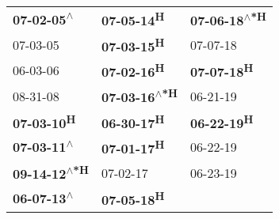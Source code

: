 \begin{supertabular}{lll}
   \textbf{07-02-05\textsuperscript{$\wedge$}} &           \textbf{07-05-14\textsuperscript{H}} &  \textbf{07-06-18\textsuperscript{$\wedge$*H}} \\
                    07-03-05\textsuperscript{} &           \textbf{07-03-15\textsuperscript{H}} &                     07-07-18\textsuperscript{} \\
                    06-03-06\textsuperscript{} &           \textbf{07-02-16\textsuperscript{H}} &           \textbf{07-07-18\textsuperscript{H}} \\
                    08-31-08\textsuperscript{} &  \textbf{07-03-16\textsuperscript{$\wedge$*H}} &                     06-21-19\textsuperscript{} \\
          \textbf{07-03-10\textsuperscript{H}} &           \textbf{06-30-17\textsuperscript{H}} &           \textbf{06-22-19\textsuperscript{H}} \\
   \textbf{07-03-11\textsuperscript{$\wedge$}} &           \textbf{07-01-17\textsuperscript{H}} &                     06-22-19\textsuperscript{} \\
 \textbf{09-14-12\textsuperscript{$\wedge$*H}} &                     07-02-17\textsuperscript{} &                     06-23-19\textsuperscript{} \\
   \textbf{06-07-13\textsuperscript{$\wedge$}} &           \textbf{07-05-18\textsuperscript{H}} &                                                \\
\end{supertabular}
